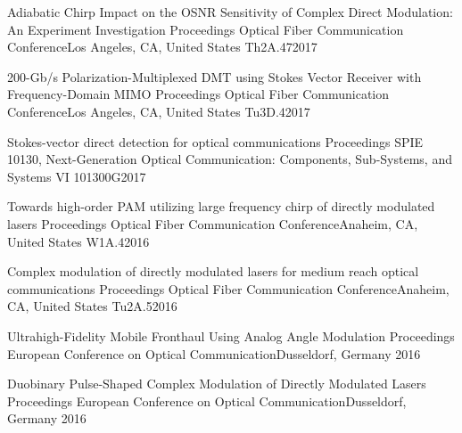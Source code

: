 \begin{cvpubs}[fontsize=12pt, series=papers, top=-0.5mm]
    {Adiabatic Chirp Impact on the OSNR Sensitivity of Complex Direct Modulation: An Experiment Investigation}%
    {Proceedings Optical Fiber Communication Conference}{Los Angeles, CA, United States}{}%
    {Th2A.47}{}{2017}

    {200-Gb/s Polarization-Multiplexed DMT using Stokes Vector Receiver with Frequency-Domain MIMO}%
    {Proceedings Optical Fiber Communication Conference}{Los Angeles, CA, United States}{}%
    {Tu3D.4}{}{2017}

    {Stokes-vector direct detection for optical communications}%
    {Proceedings SPIE 10130, Next-Generation Optical Communication: Components, Sub-Systems, and Systems VI}{}{}%
    {101300G}{}{2017}

    {Towards high-order PAM utilizing large frequency chirp of directly modulated lasers}%
    {Proceedings Optical Fiber Communication Conference}{Anaheim, CA, United States}{}%
    {W1A.4}{}{2016}

    {Complex modulation of directly modulated lasers for medium reach optical communications}%
    {Proceedings Optical Fiber Communication Conference}{Anaheim, CA, United States}{}%
    {Tu2A.5}{}{2016}

    {Ultrahigh-Fidelity Mobile Fronthaul Using Analog Angle Modulation}%
    {Proceedings European Conference on Optical Communication}{Dusseldorf, Germany}{}%
    {}{}{2016}

    {Duobinary Pulse-Shaped Complex Modulation of Directly Modulated Lasers}%
    {Proceedings European Conference on Optical Communication}{Dusseldorf, Germany}{}%
    {}{}{2016}


\end{cvpubs}
